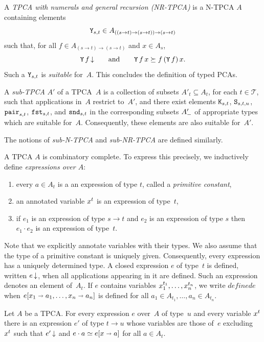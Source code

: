 A \emph{TPCA with numerals and general recursion (NR-TPCA)} is a
N-TPCA $A$ containing elements
%
\begin{equation*}
  \mathtt{Y}_{s,t} \in A_{((s \to t) \to (s \to t)) \to (s \to t)}
\end{equation*}
%
such that, for all $f \in A_{(s \to t) \to (s \to t)}$ and $x \in A_s$,
%
\begin{equation*}
  \mathtt{Y} \, f\,{\downarrow}
  \qquad\text{and}\qquad
  \mathtt{Y} \, f \, x \succeq f \, (\mathtt{Y}\, f) \, x.
\end{equation*}
%
Such a $\mathtt{Y}_{s,t}$ is \emph{suitable} for~$A$. This concludes the
definition of typed PCAs.

A \emph{sub-TPCA} $A'$ of a TPCA~$A$ is a collection of subsets $A'_t
\subseteq A_t$, for each $t \in \mathcal{T}$, such that applications
in~$A$ restrict to~$A'$, and there exist elements
$\mathtt{K}_{s,t}$, $\mathtt{S}_{s,t,u}$, $\mathtt{pair}_{s,t}$, $\mathtt{fst}_{s,t}$,
and $\mathtt{snd}_{s,t}$ in the corresponding subsets $A'_{{-}}$ of
appropriate types which are suitable for~$A$. Consequently, these
elements are also suitable for~$A'$.

The notions of \emph{sub-N-TPCA} and \emph{sub-NR-TPCA} are defined
similarly.

A TPCA $A$ is combinatory complete. To express this precisely, we
inductively define \emph{expressions over $A$}:
%
\begin{enumerate}
\item every $a \in A_t$ is a an expression of type $t$, called a
  \emph{primitive constant},
\item an annotated variable $x^{t}$ is an expression of type~$t$,
\item if $e_1$ is an expression of type $s \to t$ and $e_2$ is an
  expression of type $s$ then $e_1 \cdot e_2$ is an expression of
  type~$t$.
\end{enumerate}
%
Note that we explicitly annotate variables with their types. We also
assume that the type of a primitive constant is uniquely given.
Consequently, every expression has a uniquely determined type. A
closed expression $e$ of type~$t$ is defined, written $e\,{\downarrow}$,
when all applications appearing in it are defined. Such an expression
denotes an element of~$A_t$. If $e$ contains variables
$x_1^{t_1}, \ldots, x_n^{t_n}$, we write $defined{e}$
when $e[x_1 \shortrightarrow a_1, \ldots, x_n \shortrightarrow a_n]$ is defined
for all $a_1 \in A_{t_1}, \ldots, a_n \in A_{t_n}$.

\begin{theorem}
  Let $A$ be a TPCA. For every expression $e$ over~$A$ of type~$u$ and
  every variable $x^{t}$ there is an expression $e'$ of type $t
  \to u$ whose variables are those of~$e$ excluding~$x^{t}$
  such that $e'\,{\downarrow}$ and $e \cdot a \simeq e[x \shortrightarrow
    a]$ for all $a \in A_t$.
\end{theorem}


